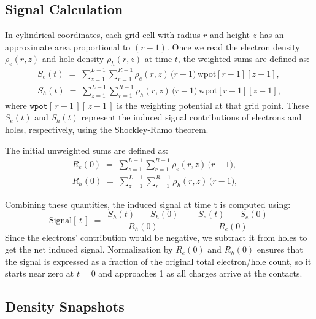 \subsection{Signal Calculation}
In cylindrical coordinates, each grid cell with radius $r$ and height $z$ has an approximate area proportional to $(r - 1)$. Once we read the electron 
density $\rho_e(r,z)$ and hole density $\rho_h(r,z)$ at time $t$, the weighted sums are defined as:
\begin{align}
S_e(t) \;=\; \sum_{z=1}^{L-1} \sum_{r=1}^{R-1}
   \rho_e(r,z)\,\bigl(r-1\bigr)\,\text{wpot}[r-1][z-1],\\
S_h(t) \;=\; \sum_{z=1}^{L-1} \sum_{r=1}^{R-1}
   \rho_h(r,z)\,\bigl(r-1\bigr)\,\text{wpot}[r-1][z-1],
\end{align}
where \(\texttt{wpot}[\,r-1\,][\,z-1\,]\) is the weighting potential at that grid 
point. These $S_e(t)$ and $S_h(t)$ represent the induced signal contributions of electrons and holes, respectively, using the Shockley-Ramo theorem.

The initial unweighted sums are defined as:
\begin{align}
R_{e}(0) \;=\; \sum_{z=1}^{L-1} \sum_{r=1}^{R-1}
   \rho_e(r,z)\,\bigl(r-1\bigr), \quad \\
R_{h}(0) \;=\; \sum_{z=1}^{L-1} \sum_{r=1}^{R-1}
   \rho_h(r,z)\,\bigl(r-1\bigr), \quad
\end{align}

Combining these quantities, the induced signal at time t is computed using:
\begin{equation}
\text{Signal}[\,t\,] 
\;=\;
  \frac{\,S_h(t)\;-\;S_h(0)\,}{\,R_{h}(0)\,}
  \;-\;
  \frac{\,S_e(t)\;-\;S_e(0)\,}{\,R_{e}(0)\,}
\label{eq:net-signal}
\end{equation}
Since the electrons’ contribution would be negative, we subtract it from holes to get the net induced signal. Normalization by $R_{e}(0)$ and $R_{h}(0)$ ensures that the signal is expressed as a fraction of the original total electron/hole count, so it starts near zero at $t=0$ and approaches 1 as all charges arrive at the contacts.

\subsection{Density Snapshots}


